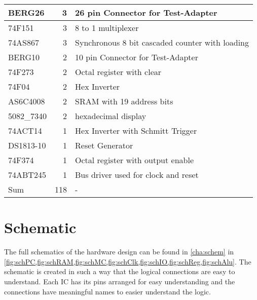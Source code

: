 \begin{table}[h]
\begin{tabularx}{\textwidth}{ |l|r||X| }
    BERG26     & 3        & 26 pin Connector for Test-Adapter                                    \\\hline
    74F151     & 3        & 8 to 1 multiplexer                                                   \\\hline
    74AS867    & 3        & Synchronous 8 bit cascaded counter with loading                      \\\hline
    BERG10     & 2        & 10 pin Connector for Test-Adapter                                    \\\hline
    74F273     & 2        & Octal register with clear                                            \\\hline
    74F04      & 2        & Hex Inverter                                                         \\\hline
    AS6C4008   & 2        & \gls{SRAM} with 19 address bits                                      \\\hline
    5082\_7340 & 2        & hexadecimal display                                                  \\\hline
    74ACT14    & 1        & Hex Inverter with Schmitt Trigger                                    \\\hline
    DS1813-10  & 1        & Reset Generator                                                      \\\hline
    74F374     & 1        & Octal register with output enable                                    \\\hline
    74ABT245   & 1        & Bus driver used for clock and reset                                  \\\hline\hline
    Sum        & 118      & -                                                                    \\\hline
  \end{tabularx}
\end{table}

\section{Schematic}\label{sec:sch}
The full schematics of the hardware design can be found in \cref{cha:schem} in \cref{fig:schPC,fig:schRAM,fig:schMC,fig:schClk,fig:schIO,fig:schReg,fig:schAlu}.
The schematic is created in such a way that the logical connections are easy to understand.
Each \gls{IC} has its pins arranged for easy understanding and the connections have meaningful names to easier understand the logic.

